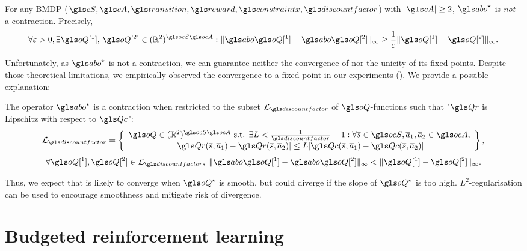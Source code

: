 \begin{theorem}
	\begin{leftbar}[theorembar]
	\label{thm:contraction}
	For any \gls{BMDP} ($\cS,\cA,\Ps,\R,\constraint,\discountfactor$) with $|\cA| \geq 2$, $\abo^{\star}$ is \emph{not} a contraction. Precisely, $$\forall\epsilon>0, \exists \oQ[^1],\,\oQ[^2]\in(\Real^2)^{\ocS\ocA}:\|\abo \oQ[^1]-\abo \oQ[^2]\|_\infty \geq \frac{1}{\epsilon}\|\oQ[^1] - \oQ[^2]\|_\infty.$$
	\end{leftbar}
\end{theorem}

Unfortunately, as $\abo^{\star}$ is not a contraction, we can guarantee neither the convergence of  nor the unicity of its fixed points. Despite those theoretical limitations, we empirically observed the convergence to a fixed point in our experiments (). We provide a possible explanation:

\begin{theorem}
	\begin{leftbar}[theorembar]
	\label{rmk:contractivity-smooth}
	The operator $\abo^{\star}$ is a contraction when restricted to the subset $\cL_{\discountfactor}$ of $\oQ$-functions such that "$\Qr$ is Lipschitz with respect to $\Qc$":
	\begin{equation}
	\cL_\discount = \left\{\begin{array}{cc}
	\oQ\in(\Real^2)^{\ocS\ocA}\text{ s.t. }\exists L<\frac{1}{\discount}-1: \forall \os\in\ocS,\oa_1,\oa_2\in\ocA,   \\
	|\Qr(\os,\oa_1) - \Qr(\os,\oa_2)| \leq L|\Qc(\os,\oa_1) - \Qc(\os,\oa_2)|
	\end{array}\right\},
	\end{equation}
	\begin{equation*}
	\forall \oQ[^1],\oQ[^2]\in \cL_\discount,\; \|\abo \oQ[^1]- \abo \oQ[^2]\|_\infty  < \|\oQ[^1]-\oQ[^2]\|_\infty.
	\end{equation*}
	\end{leftbar}
\end{theorem}

Thus, we expect that  is likely to converge when $\oQ^{\star}$ is smooth, but could diverge if the slope of $\oQ^{\star}$ is too high.  $L^2$-regularisation can be used to encourage smoothness and mitigate risk of divergence.


\section{Budgeted reinforcement learning}

